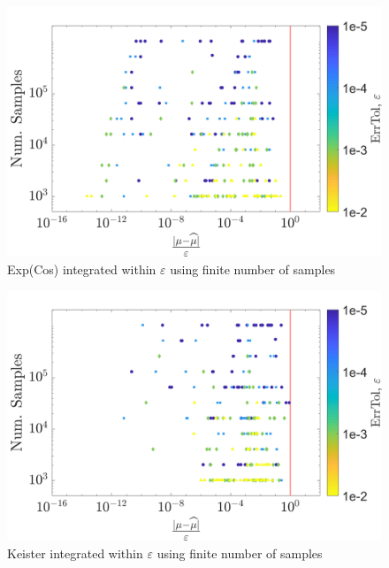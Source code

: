 \documentclass[twocolumn]{svjour3}          %
\begin{document}
\begin{figure}
	\centering
	\includegraphics[width=0.95\linewidth]{"figures/Exp(cos) guaranteed npts 19-Jul-2018 08-14-22"}
	\caption[Exp(Cos) guaranteed : Number of samples]{Exp(Cos) integrated within $\varepsilon$ using finite number of samples}
	\label{fig:expcos-guaranteed-npts}
\end{figure}
\begin{figure}
	\centering
	\includegraphics[width=0.95\linewidth]{"figures/Keister guaranteed npts 20-Jul-2018 20-54-43"}
	\caption[Keister guaranteed: Num sample]{Keister integrated within $\varepsilon$ using finite number of samples}
	\label{fig:keister-guaranteed-npts}
\end{figure}
\end{document}
